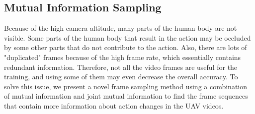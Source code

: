 \documentclass[10pt,twocolumn,letterpaper]{article}
\begin{document}
{\begin{table*}[!t]
{\begin{tabular}{c c c c c c}
\bottomrule 
\end{tabular}
}
\vspace{-7pt}
\caption{Benchmarking UAV Human and comparisons with prior arts.. For $224\times 224$ resolution and 16 frames input, when training from scratch, our approach achieves a $13.2\%$ improvement over the baseline X3D-M and $12.6\%$ over the current state-of-the-art FAR. For $520\times 520$ resolution and 8 frames input, MITFAS overperforms the current state-of-the-art FAR by $9.6\%$ when training from scratch. For $224\times 224$ resolution and 16 frames input, when initializing with Kinetics pre-trained weights, MITFAS improves the top-1 accuracy over baseline by $20.2\%$ and over SOTA method by $18.9\%$. For resolution over $620\times 620$ and  8 frames input, when initializing with Kinetics pretrained weights, MITFAS overperforms the current state-of-the-art FAR by $7.5\%$. Our method obtains better performance in all settings, which illustrates the effectiveness of our proposed MITFAS.}
\vspace{-7pt}
\label{tab:resolution}
\end{table*} \subsection{Mutual Information Sampling}\label{subsec:sampling}
Because of the high camera altitude, many parts of the human body are not visible. Some parts of the human body that result in the action may be occluded by some other parts that do not contribute to the action. Also, there are lots of "duplicated" frames because of the high frame rate, which essentially contains redundant information. Therefore, not all the video frames are useful for the training, and using some of them may even decrease the overall accuracy. To solve this issue, we present a novel frame sampling method using a combination of mutual information and joint mutual information to find the frame sequences that contain more information about action changes in the UAV videos. 

}
\end{document}
